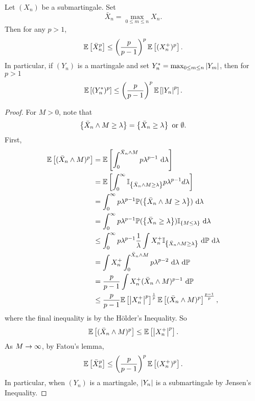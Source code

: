 \begin{thm}
    Let $(X_n)$ be a submartingale. Set
    \begin{equation*}
        \bar{X}_n = \max_{0 \leq m \leq n} X_n.
    \end{equation*}
    Then for any $p > 1$,
    \begin{equation*}
        \mathbb{E}\left[\bar{X}_n^p\right] \leq \left(\frac{p}{p-1}\right)^p \mathbb{E}\left[(X_n^+)^p\right].
    \end{equation*}
    In particular, if $(Y_n)$ is a martingale and set $Y_n^* = \max_{0 \leq m \leq n}\left\lvert Y_m\right\lvert$, then for $p > 1$
    \begin{equation*}
        \mathbb{E}\left[(Y^*_n)^p\right] \leq \left(\frac{p}{p-1}\right)^p \mathbb{E}\left[\left\lvert Y_n\right\lvert^p\right].
    \end{equation*}
\end{thm}
\begin{proof}
    For $M > 0$, note that
    \begin{equation*}
        \left\{\bar{X}_n \wedge M \geq \lambda\right\} = \left\{\bar{X}_n \geq \lambda\right\} \text{ or } \emptyset.
    \end{equation*}
    First,
    \begin{equation*}
        \begin{aligned}
            \mathbb{E}\left[(\bar{X}_n \wedge M)^p\right] &= \mathbb{E}\left[\int_0^{\bar{X}_n \wedge M}p\lambda^{p-1}~\mathrm{d}\lambda \right] \\
            &= \mathbb{E}\left[\int_0^\infty \mathbb{I}_{\left\{\bar{X}_n \wedge M \geq \lambda\right\}} p\lambda^{p-1}d\lambda\right] \\
            &= \int_0^\infty p\lambda^{p-1} \mathbb{P}(\left\{\bar{X}_n \wedge M \geq \lambda\right\}) ~\mathrm{d}\lambda \\
            &= \int_0^\infty p\lambda^{p-1} \mathbb{P}(\left\{\bar{X}_n \geq \lambda\right\})\mathbb{I}_{\left\{M \leq \lambda\right\}} ~\mathrm{d}\lambda \\
            &\leq \int_0^\infty p\lambda^{p-1} \frac{1}{\lambda} \int X_n^+ \mathbb{I}_{\left\{\bar{X}_n \wedge M \geq \lambda\right\}} ~\mathrm{d}\mathbb{P}~\mathrm{d}\lambda \\
            &= \int X_n^+ \int_0^{\bar{X}_n \wedge M}p\lambda^{p-2} ~\mathrm{d}\lambda~\mathrm{d}\mathbb{P} \\
            &= \frac{p}{p-1}\int X_n^+ (\bar{X}_n \wedge M)^{p-1} ~\mathrm{d}\mathbb{P} \\
            &\leq \frac{p}{p-1} \mathbb{E}\left[\left\lvert X_n^+\right\lvert^p\right]^{\frac{1}{p}}\mathbb{E}\left[(\bar{X}_n \wedge M)^p\right]^{\frac{p-1}{p}},
        \end{aligned}
    \end{equation*}
    where the final inequality is by the H\"older's Inequality. So
    \begin{equation*}
        \mathbb{E}\left[(\bar{X}_n \wedge M)^p\right] \leq \mathbb{E}\left[\left\lvert X_n^+\right\lvert^p\right].
    \end{equation*}
    As $M \rightarrow \infty$, by Fatou's lemma,
    \begin{equation*}
        \mathbb{E}\left[\bar{X}_n^p\right] \leq \left(\frac{p}{p-1}\right)^p \mathbb{E}\left[(X_n^+)^p\right].
    \end{equation*}
    In particular, when $(Y_n)$ is a martingale, $\left\lvert Y_n\right\lvert$ is a submartingale by Jensen's Inequality. \qedhere
\end{proof}

